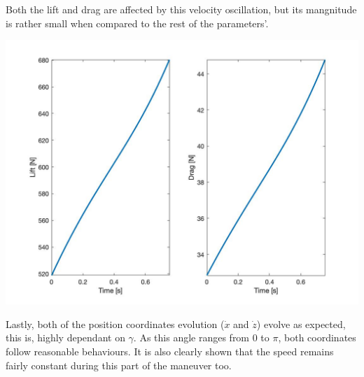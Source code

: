 Both the lift and drag are affected by this velocity oscillation, but its mangnitude is rather small when compared to the rest of the parameters'.

\begin{center}
	\includegraphics[width=\linewidth]{../matlab/2/liftdrag.jpg}
	\vspace{0.5cm}
	\vspace{0.25cm}
	\label{fig:Ld2}
\end{center}

Lastly, both of the position coordinates evolution ($\Dot{x}$ and $\Dot{z}$) evolve as expected, this is, highly dependant on $\gamma$. As this angle ranges from 0 to $\pi$, both coordinates follow reasonable behaviours. It is also clearly shown that the speed remains fairly constant during this part of the maneuver too.


